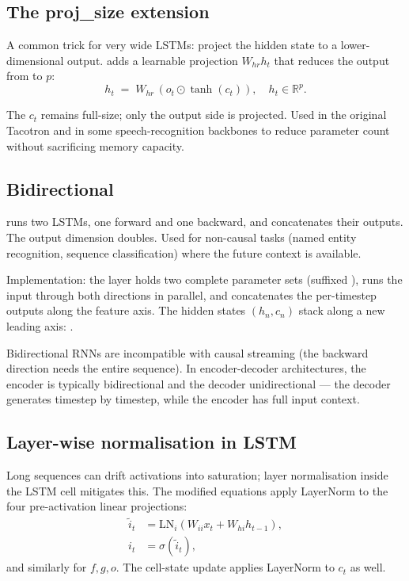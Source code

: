 \subsection{The proj\_size extension}
\label{ssec:rnn_family:proj_size}

A common trick for very wide LSTMs: project the hidden state to a
lower-dimensional output.  adds
a learnable projection $W_{hr} h_t$ that reduces the output from
 to $p$:
\[
h_t \;=\; W_{hr}\,(o_t \odot \tanh(c_t)),
\quad h_t \in \mathbb{R}^p.
\]

The $c_t$ remains full-size; only the output side is projected.
Used in the original Tacotron and in some speech-recognition
backbones to reduce parameter count without sacrificing memory
capacity.

\subsection{Bidirectional}
\label{ssec:rnn_family:bidirectional}

 runs two LSTMs, one
forward and one backward, and concatenates their outputs. The
output dimension doubles. Used for non-causal tasks (named entity
recognition, sequence classification) where the future context is
available.

Implementation: the layer holds two complete parameter sets
(suffixed ), runs the input through both
directions in parallel, and concatenates the per-timestep
outputs along the feature axis. The hidden states
$(h_n, c_n)$ stack along a new leading axis:
.

Bidirectional RNNs are incompatible with causal streaming (the
backward direction needs the entire sequence). In
encoder-decoder architectures, the encoder is typically
bidirectional and the decoder unidirectional --- the decoder
generates timestep by timestep, while the encoder has full
input context.

\subsection{Layer-wise normalisation in LSTM}
\label{ssec:rnn_family:lstm_ln}

Long sequences can drift activations into saturation; layer
normalisation inside the LSTM cell mitigates this. The
modified equations apply LayerNorm to the four pre-activation
linear projections:
\begin{align*}
  \tilde{i}_t &= \mathrm{LN}_i(W_{ii} x_t + W_{hi} h_{t-1}), \\
  i_t &= \sigma(\tilde{i}_t),
\end{align*}
and similarly for $f, g, o$. The cell-state update applies
LayerNorm to $c_t$ as well.


